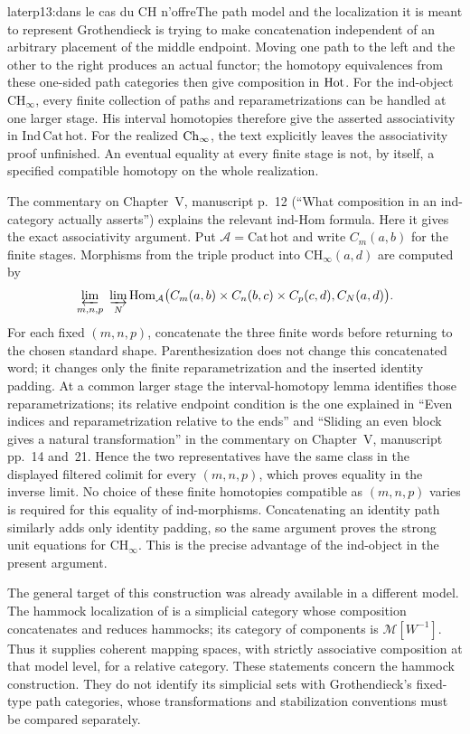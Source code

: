 \begin{dcomment}{later}{p13:dans le cas du CH n'offre}{The path model and the localization it is meant to represent}
Grothendieck is trying to make concatenation independent of an arbitrary placement of the middle endpoint. Moving one path to the left and the other to the right produces an actual functor; the homotopy equivalences from these one-sided path categories then give composition in $\mathrm{Hot}$. For the ind-object $\mathrm{CH}_\infty$, every finite collection of paths and reparametrizations can be handled at one larger stage. His interval homotopies therefore give the asserted associativity in $\mathrm{Ind\,Cat\,hot}$. For the realized $\mathrm{Ch}_\infty$, the text explicitly leaves the associativity proof unfinished. An eventual equality at every finite stage is not, by itself, a specified compatible homotopy on the whole realization.

The commentary on Chapter~V, manuscript p.~12 (``What composition in an ind-category actually asserts'') explains the relevant ind-Hom formula. Here it gives the exact associativity argument. Put $\mathcal A=\mathrm{Cat\,hot}$ and write $C_m(a,b)$ for the finite stages. Morphisms from the triple product into $\mathrm{CH}_\infty(a,d)$ are computed by
\[
 \varprojlim_{m,n,p}\ \varinjlim_N
 \operatorname{Hom}_{\mathcal A}\bigl(
 C_m(a,b)\times C_n(b,c)\times C_p(c,d),C_N(a,d)\bigr).
\]
For each fixed $(m,n,p)$, concatenate the three finite words before returning to the chosen standard shape. Parenthesization does not change this concatenated word; it changes only the finite reparametrization and the inserted identity padding. At a common larger stage the interval-homotopy lemma identifies those reparametrizations; its relative endpoint condition is the one explained in ``Even indices and reparametrization relative to the ends'' and ``Sliding an even block gives a natural transformation'' in the commentary on Chapter~V, manuscript pp.~14 and~21. Hence the two representatives have the same class in the displayed filtered colimit for every $(m,n,p)$, which proves equality in the inverse limit. No choice of these finite homotopies compatible as $(m,n,p)$ varies is required for this equality of ind-morphisms. Concatenating an identity path similarly adds only identity padding, so the same argument proves the strong unit equations for $\mathrm{CH}_\infty$. This is the precise advantage of the ind-object in the present argument.

The general target of this construction was already available in a different model. The hammock localization of \citet[\S2; Propositions 2.2 and 3.1]{DwyerKan1980Calculating} is a simplicial category whose composition concatenates and reduces hammocks; its category of components is $\mathcal M[W^{-1}]$. Thus it supplies coherent mapping spaces, with strictly associative composition at that model level, for a relative category. These statements concern the hammock construction. They do not identify its simplicial sets with Grothendieck's fixed-type path categories, whose transformations and stabilization conventions must be compared separately.


\end{dcomment}

